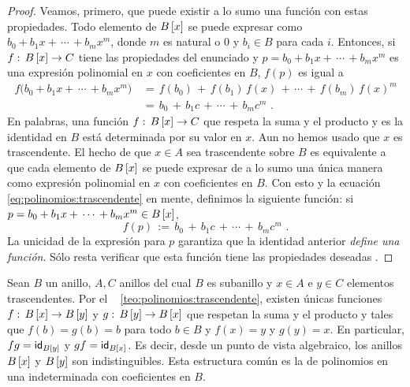 \begin{proof}
	Veamos, primero, que puede existir a lo sumo una funci\'on con
	estas propiedades. Todo elemento de $\polinomios[x] B$ se puede
	expresar como $b_0+b_1x+\,\cdots\,+b_mx^m$, donde $m$ es natural o
	$0$ y $b_i\in B$ para cada $i$. Entonces, si
	$f:\,\polinomios[x] B\rightarrow C$ tiene las
	propiedades del enunciado y $p=b_0+b_1x+\,\cdots\,+b_mx^m$ es una
	expresi\'on polinomial en $x$ con coeficientes en $B$, $f(p)$ es
	igual a
	\begin{equation}
		\label{eq:polinomios:trascendente}
		\begin{aligned}
			f\big(b_0+b_1x+\,\cdots\,+b_mx^m\big) & \,=\,
				f(b_0)\,+\,f(b_1)\,f(x)\,+\,\cdots\,+\,
					f(b_m)\,f(x)^m \\
			& \,=\, b_0\,+\,b_1c\,+\,\cdots\,+\,b_mc^m
			\text{ .}
		\end{aligned}
	\end{equation}
	En palabras, una funci\'on
	$f:\,\polinomios[x] B\rightarrow C$ que respeta la
	suma y el producto y es la identidad en $B$ est\'a determinada
	por su valor en $x$. Aun no hemos usado que $x$ es trascendente.
	El hecho de que $x\in A$ sea trascendente sobre $B$ es equivalente
	a que cada elemento de $\polinomios[x] B$ se puede expresar de a lo
	sumo una \'unica manera como expresi\'on polinomial en $x$ con
	coeficientes en $B$. Con esto y la ecuaci\'on~%
	\eqref{eq:polinomios:trascendente} en mente, definimos la siguiente
	funci\'on: si $p=b_0+b_1x+\,\cdots\,+b_mx^m\in\polinomios[x] B$,
	\begin{displaymath}
		f(p)\,:=\,
			b_0\,+\,b_1c\,+\,\cdots\,+\,b_mc^m
		\text{ .}
	\end{displaymath}
	La unicidad de la expresi\'on para $p$ garantiza que la
	identidad anterior \emph{define una funci\'on}.
	S\'olo resta verificar que esta funci\'on tiene las propiedades
	deseadas \quedacomoejercicio.
\end{proof}

\begin{obsPolinomios}\label{obs:polinomios:trascendente}
	Sean $B$ un anillo, $A,C$ anillos del cual $B$ es subanillo y
	$x\in A$ e $y\in C$ elementos trascendentes. Por el \teoname~%
	\ref{teo:polinomios:trascendente}, existen \'unicas funciones
	$f:\,\polinomios[x] B\rightarrow\polinomios[y] B$ y
	$g:\,\polinomios[y] B\rightarrow\polinomios[x] B$ que respetan la suma
	y el producto y tales que $f(b)=g(b)=b$ para todo $b\in B$ y
	$f(x)=y$ y $g(y)=x$. En particular, $fg=\id[{\polinomios[y] B}]$ y
	$gf=\id[{\polinomios[x] B}]$. Es decir, desde un punto de vista
	algebraico, los anillos $\polinomios[x] B$ y $\polinomios[y] B$ son
	indistinguibles.
	Esta estructura com\'un es la %
	de polinomios en una indeterminada con coeficientes en $B$.
\end{obsPolinomios}


